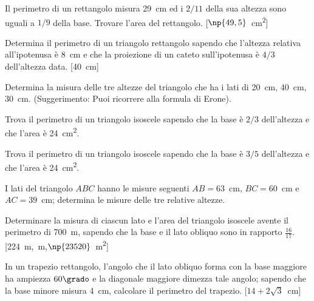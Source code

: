 \begin{multicols}{2}
\begin{esercizio}
\label{ese:7.69}
Il perimetro di un rettangolo misura 29~cm ed i \(2/11\) della sua 
altezza sono uguali a \(1/9\) della base. Trovare l'area del rettangolo.
\hfill[\(\np{49,5}\)~cm\textsuperscript{2}]
\end{esercizio}

\begin{esercizio}
\label{ese:7.77}
Determina il perimetro di un triangolo rettangolo sapendo che 
l'altezza relativa all'ipotenusa è 8~cm e che la proiezione di un 
cateto sull'ipotenusa è \(4/3\) dell'altezza data.
\hfill[40~cm]
\end{esercizio}

\begin{esercizio}
\label{ese:7.78}
Determina la misura delle tre altezze del triangolo che ha i lati di 
20~cm, 40~cm, 30~cm. (Suggerimento: Puoi ricorrere alla formula di 
Erone).
\end{esercizio}

\begin{esercizio}
\label{ese:7.80}
Trova il perimetro di un triangolo isoscele sapendo che la base è 
\(2/3\) dell'altezza e che l'area è 24~cm\textsuperscript{2}.
\end{esercizio}

\begin{esercizio}
\label{ese:7.81}
Trova il perimetro di un triangolo isoscele sapendo che la base è 
\(3/5\) dell'altezza e che l'area è 24~cm\textsuperscript{2}.
\end{esercizio}

\begin{esercizio}
\label{ese:7.82}
I lati del triangolo \(ABC\) hanno le misure seguenti \(AB=63\)~cm, 
\(BC=60\)~cm e \(AC=39\)~cm; determina le misure delle tre relative 
altezze.
\end{esercizio}

\begin{esercizio}
\label{ese:7.83}
Determinare la misura di ciascun lato e l'area del triangolo isoscele 
avente il perimetro di 700~m, sapendo che la base e il lato obliquo 
sono in rapporto \(\frac{16}{17}\).
\hfill[224~m,~m,\quad \(\np{23520}\)~m\textsuperscript{2}]
\end{esercizio}

\begin{esercizio}
\label{ese:7.87}
In un trapezio rettangolo, l'angolo che il lato obliquo forma con la 
base maggiore ha ampiezza \(60\grado\) e la diagonale maggiore dimezza 
tale angolo; sapendo che la base minore misura 4~cm,  calcolare il 
perimetro del trapezio.
\hfill[\(14 + 2\sqrt{3}\)~cm]
\end{esercizio}


\end{multicols}
